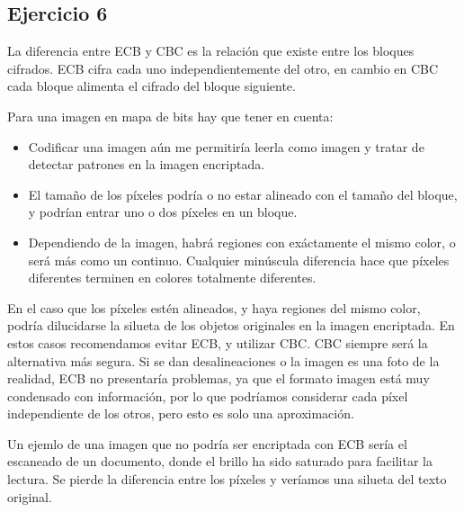 \documentclass[12pt]{article}
\begin{document}
\subsection*{Ejercicio 6}

La diferencia entre ECB y CBC es la relación que existe entre los bloques cifrados. ECB cifra cada uno independientemente del otro, en cambio en CBC cada bloque alimenta el cifrado del bloque siguiente. 

Para una imagen en mapa de bits hay que tener en cuenta:

\begin{itemize}
    \item Codificar una imagen aún me permitiría leerla como imagen y tratar de detectar patrones en la imagen encriptada.
    \item El tamaño de los píxeles podría o no estar alineado con el tamaño del bloque, y podrían entrar uno o dos píxeles en un bloque.
    \item Dependiendo de la imagen, habrá regiones con exáctamente el mismo color, o será más como un continuo. Cualquier minúscula diferencia hace que píxeles diferentes terminen en colores totalmente diferentes.
\end{itemize}

En el caso que los píxeles estén alineados, y haya regiones del mismo color, podría dilucidarse la silueta de los objetos originales en la imagen encriptada. En estos casos recomendamos evitar ECB, y utilizar CBC. CBC siempre será la alternativa más segura. Si se dan desalineaciones o la imagen es una foto de la realidad, ECB no presentaría problemas, ya que el formato imagen está muy condensado con información, por lo que podríamos considerar cada píxel independiente de los otros, pero esto es solo una aproximación.

Un ejemlo de una imagen que no podría ser encriptada con ECB sería el escaneado de un documento, donde el brillo ha sido saturado para facilitar la lectura. Se pierde la diferencia entre los píxeles y veríamos una silueta del texto original.
\end{document}
